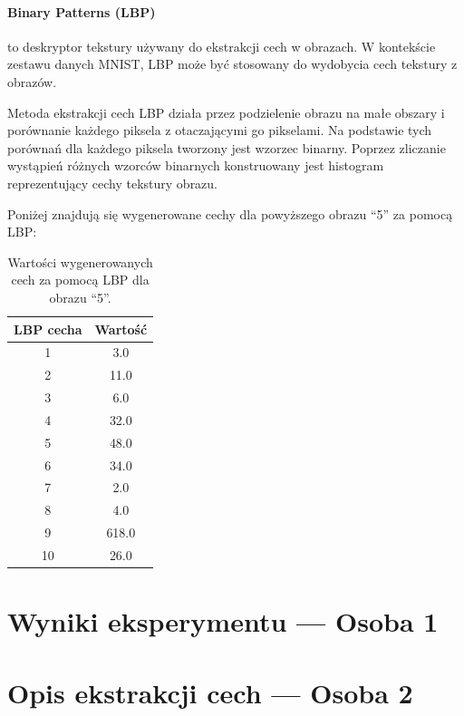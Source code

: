\documentclass[10pt]{article}
\begin{document}
\paragraph*{Binary Patterns (LBP)} to deskryptor tekstury używany do ekstrakcji cech w obrazach. W kontekście zestawu danych MNIST, LBP może być stosowany do wydobycia cech tekstury z obrazów.

Metoda ekstrakcji cech LBP działa przez podzielenie obrazu na małe obszary i porównanie każdego piksela z otaczającymi go pikselami. Na podstawie tych porównań dla każdego piksela tworzony jest wzorzec binarny. Poprzez zliczanie wystąpień różnych wzorców binarnych konstruowany jest histogram reprezentujący cechy tekstury obrazu.

Poniżej znajdują się wygenerowane cechy dla powyższego obrazu ``5'' za pomocą LBP:
\begin{table}[h]
    \centering
    \begin{tabular}{|c|c|}
        \toprule
        \textbf{LBP cecha} & \textbf{Wartość} \\
        \midrule
        1                  & 3.0              \\
        2                  & 11.0             \\
        3                  & 6.0              \\
        4                  & 32.0             \\
        5                  & 48.0             \\
        6                  & 34.0             \\
        7                  & 2.0              \\
        8                  & 4.0              \\
        9                  & 618.0            \\
        10                 & 26.0             \\
        \bottomrule
    \end{tabular}
    \caption{Wartości wygenerowanych cech za pomocą LBP dla obrazu ``5''.}
\end{table}

\pagebreak

\section{Wyniki eksperymentu --- Osoba 1}
\pagebreak

\section{Opis ekstrakcji cech --- Osoba 2}
\end{document}
